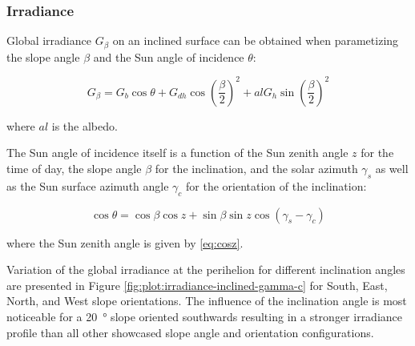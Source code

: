 \subsubsection{Irradiance}
\label{sec:MartianEnvironment:SolarRadiation:InclinedSurface:Irradiance}

Global irradiance $G_{\beta}$ on an inclined surface can be obtained when parametizing the slope angle $\beta$ and the Sun angle of incidence $\theta$:

\begin{equation}
  \label{eq:G_beta}
  G_{\beta} = G_{b}\cos{\theta} + G_{dh}\cos{(\frac{\beta}{2})}^2 + al G_{h} \sin{(\frac{\beta}{2})}^2
\end{equation}

where $al$ is the albedo.

The Sun angle of incidence itself is a function of the Sun zenith angle $z$ for the time of day, the slope angle $\beta$ for the inclination, and the solar azimuth $\gamma_{s}$ as well as the Sun surface azimuth angle $\gamma_{c}$ for the orientation of the inclination:

\begin{equation}
  \label{eq:costheta}
  \cos{\theta} = \cos{\beta}\cos{z} +  \sin{\beta}\sin{z}\cos{(\gamma_{s} - \gamma_{c})}
\end{equation}

where the Sun zenith angle is given by \ref{eq:cosz}.

Variation of the global irradiance at the perihelion for different inclination angles are presented in Figure \ref{fig:plot:irradiance-inclined-gamma-c} for South, East, North, and West slope orientations. The influence of the inclination angle is most noticeable for a \SI{20}{\degree} slope oriented southwards resulting in a stronger irradiance profile than all other showcased slope angle and orientation configurations.

